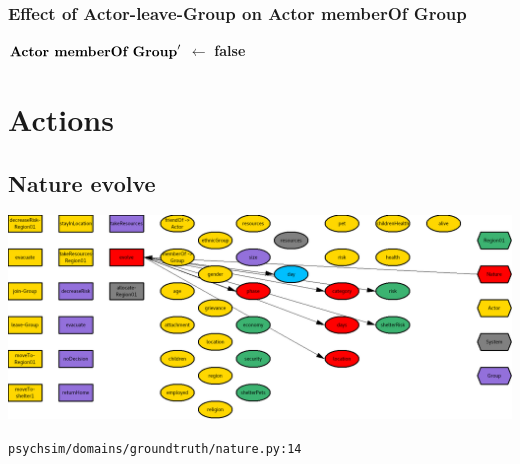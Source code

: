\documentclass{article}%
\begin{document}
%
\subsubsection{Effect of Actor{-}leave{-}Group on Actor memberOf Group}%
\label{ssubsec:Effect of Actor{-}leave{-}Group on Actor memberOf Group}%
\begin{flushleft}%
$\mbox{\textbf{Actor memberOf Group}} '$%
$\leftarrow$%
\textbf{false}%
\end{flushleft}

%
\section{Actions}%
\label{sec:Actions}%
\subsection{Nature evolve}%
\label{subsec:Nature evolve}%
\includegraphics[width=\textwidth]{images/Nature-evolve.png}%
\begin{flushleft}%
\verb|psychsim/domains/groundtruth/nature.py:14|%
\end{flushleft}%
\end{document}
